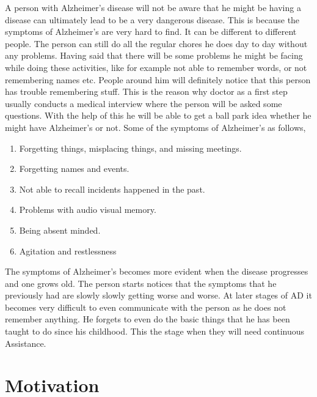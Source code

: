 \documentclass[12pt,onecolumn]{report}
\begin{document}
A person with Alzheimer's disease will not be aware that he might be having a disease can ultimately lead to be a very dangerous disease. This is because the symptoms of Alzheimer's are very hard to find. It can be different to different people. The person can still do all the regular chores he does day to day without any problems. Having said that there will be some problems he might be facing while doing these activities, like for example not able to remember words, or not remembering names etc. People around him will definitely notice that this person has trouble remembering stuff. This is the reason why doctor as a first step usually conducts a medical interview where the person will be asked some questions. With the help of this he will be able to get a ball park idea whether he might have Alzheimer's or not. Some of the symptoms of Alzheimer's as follows,
\begin{enumerate}[nosep]
    \item Forgetting things, misplacing things, and missing meetings.
    \item Forgetting names and events.
    \item Not able to recall incidents happened in the past.
    \item Problems with audio visual memory.
    \item Being absent minded.
    \item Agitation and restlessness
\end{enumerate}

The symptoms of Alzheimer's becomes more evident when the disease progresses and one grows old. The person starts notices that the symptoms that he previously had are slowly slowly getting worse and worse. At later stages of AD it becomes very difficult to even communicate with the person as he does not remember anything. He forgets to even do the basic things that he has been taught to do since his childhood. This the stage when they will need continuous Assistance. 

\chapter{Motivation}
\end{document}
